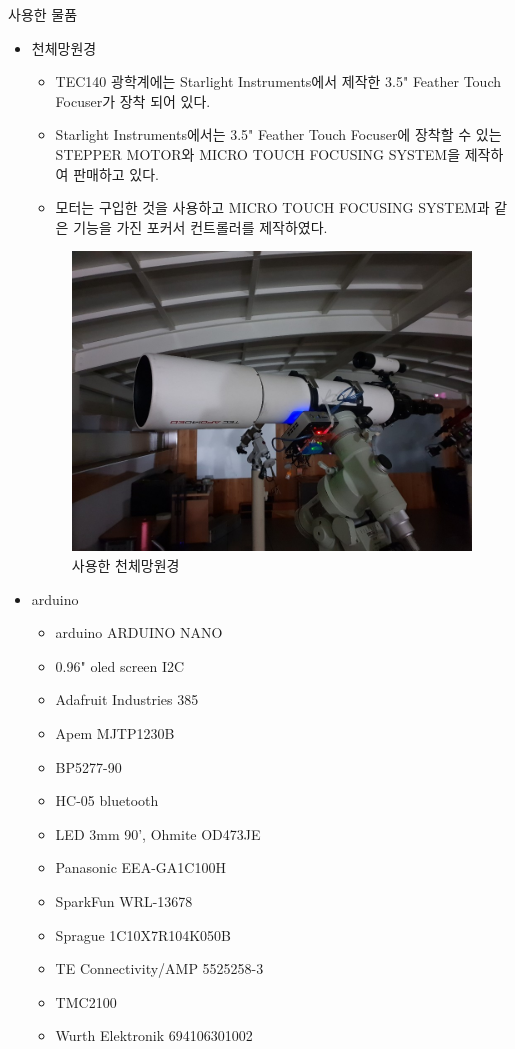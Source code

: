 \documentclass{gshs_poster_beamer}
\begin{document}
\begin{columns}[T]
\begin{posterbox}[colbacktitle=black,coltitle=white,colback=black!5]{사용한 물품}
	\begin{itemize}
		\item 천체망원경
		\begin{itemize}
			\item TEC140 광학계에는 Starlight Instruments에서 제작한 3.5" Feather Touch Focuser가 장착 되어 있다.
			\item Starlight Instruments에서는 3.5" Feather Touch Focuser에 장착할 수 있는 STEPPER MOTOR와 MICRO TOUCH FOCUSING SYSTEM을 제작하여 판매하고 있다.
			\item 모터는 구입한 것을 사용하고 MICRO TOUCH FOCUSING SYSTEM과 같은 기능을 가진 포커서 컨트롤러를 제작하였다.
		\end{itemize}
	\begin{figure}[h]
		\centering
		\includegraphics[scale=0.4]{telescope}
		\caption{사용한 천체망원경}
		\label{fig:telescope}
	\end{figure}
		\item arduino
		\begin{itemize}
			\item arduino ARDUINO NANO
			\item 0.96" oled screen I2C
			\item Adafruit Industries 385
			\item Apem MJTP1230B
			\item BP5277-90
			\item HC-05 bluetooth
			\item LED 3mm 90', Ohmite OD473JE
			\item Panasonic EEA-GA1C100H
			\item SparkFun WRL-13678
			\item Sprague 1C10X7R104K050B
			\item TE Connectivity/AMP 5525258-3
			\item TMC2100
			\item Wurth Elektronik 694106301002
		\end{itemize}
	\end{itemize}
\end{posterbox}



\end{columns}
\end{document}
